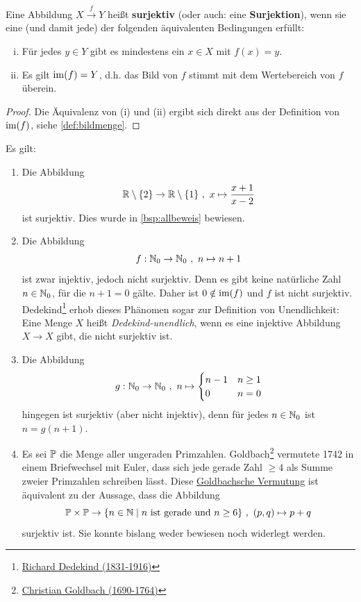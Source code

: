 \begin{defin} \label{def:surjektiv} 
    Eine Abbildung $X \xrightarrow{f} Y$ heißt \textbf{surjektiv} (oder auch: eine \textbf{Surjektion}), wenn sie eine (und damit jede) der folgenden äquivalenten Bedingungen erfüllt:
    \begin{enumerate}[(i)]
        \item Für jedes $y\in Y$ gibt es mindestens ein $x\in X$ mit $f(x)=y$.
        \item Es gilt $\operatorname{im}(f) = Y$, d.h. das Bild von $f$ stimmt mit dem Wertebereich von $f$ überein.
    \end{enumerate}
\end{defin}
\begin{proof}
    Die Äquivalenz von (i) und (ii) ergibt sich direkt aus der Definition von $\operatorname{im}(f)$, siehe \cref{def:bildmenge}.
\end{proof}


\begin{bsp} \label{bsp:surjektiv}
    Es gilt:
    \begin{enumerate}
        \item Die Abbildung
            \[ \mathbb R \setminus \{2\} \to \mathbb R \setminus \{1\} \ ,\ x \mapsto \frac{x+1}{x-2} \]
        ist surjektiv. Dies wurde in \cref{bsp:allbeweis} bewiesen.
        \item Die Abbildung
            \[ f:\mathbb N_0 \to \mathbb N_0 \ ,\ n \mapsto n+1 \]
        ist zwar injektiv, jedoch nicht surjektiv. Denn es gibt keine natürliche Zahl $n\in \mathbb N_0$, für die $n+1=0$ gälte. Daher ist $0\notin \operatorname{im}(f)$ und $f$ ist nicht surjektiv. Dedekind\footnote{\href{https://de.wikipedia.org/wiki/Richard_Dedekind}{Richard Dedekind (1831-1916)}} erhob dieses Phänomen sogar zur Definition von Unendlichkeit: Eine Menge $X$ heißt \emph{Dedekind-unendlich}, wenn es eine injektive Abbildung $X\to X$ gibt, die nicht surjektiv ist.
        \item Die Abbildung
            \[ g: \mathbb N_0 \to \mathbb N_0\ ,\ n \mapsto \begin{cases}
                n-1 & n\ge 1 \\
                0 & n=0
            \end{cases}\]
        hingegen ist surjektiv (aber nicht injektiv), denn für jedes $n \in \mathbb N_0$ ist $n=g(n+1)$.
        \item Es sei $\mathbb P$ die Menge aller ungeraden Primzahlen. Goldbach\footnote{\href{https://de.wikipedia.org/wiki/Christian_Goldbach}{Christian Goldbach (1690-1764)}} vermutete 1742 in einem Briefwechsel mit Euler, dass sich jede gerade Zahl $\ge 4$ als Summe zweier Primzahlen schreiben lässt. Diese \href{https://de.wikipedia.org/wiki/Goldbachsche_Vermutung}{Goldbachsche Vermutung} ist äquivalent zu der Aussage, dass die Abbildung
            \[ \mathbb P \times \mathbb P \to \{n\in \mathbb N \mid n\ \text{ist gerade und}\ n\ge 6\} \ ,\ (p,q) \mapsto p+q \]
        surjektiv ist. Sie konnte bislang weder bewiesen noch widerlegt werden.
    \end{enumerate}
\end{bsp}


